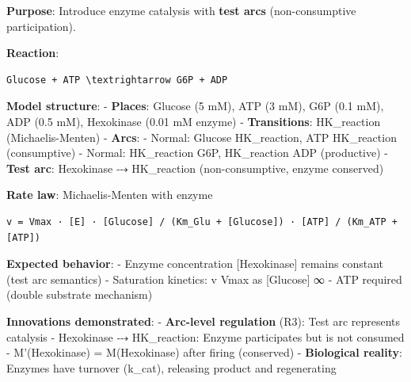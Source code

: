 \textbf{Purpose}: Introduce enzyme catalysis with \textbf{test arcs}
(non-consumptive participation).

\textbf{Reaction}:

\begin{lstlisting}
Glucose + ATP \textrightarrow G6P + ADP
\end{lstlisting}

\textbf{Model structure}: - \textbf{Places}: Glucose (5 mM), ATP (3 mM),
G6P (0.1 mM), ADP (0.5 mM), Hexokinase (0.01 mM enzyme) -
\textbf{Transitions}: HK\_reaction (Michaelis-Menten) - \textbf{Arcs}: -
Normal: Glucose \textrightarrow HK\_reaction, ATP \textrightarrow HK\_reaction (consumptive) -
Normal: HK\_reaction \textrightarrow G6P, HK\_reaction \textrightarrow ADP (productive) -
\textbf{Test arc}: Hexokinase ⤏ HK\_reaction (non-consumptive, enzyme
conserved)

\textbf{Rate law}: Michaelis-Menten with enzyme

\begin{lstlisting}
v = Vmax · [E] · [Glucose] / (Km_Glu + [Glucose]) · [ATP] / (Km_ATP + [ATP])
\end{lstlisting}

\textbf{Expected behavior}: - Enzyme concentration {[}Hexokinase{]}
remains constant (test arc semantics) - Saturation kinetics: v \textrightarrow Vmax as
{[}Glucose{]} \textrightarrow ∞ - ATP required (double substrate mechanism)

\textbf{Innovations demonstrated}: - \checkmark \textbf{Arc-level regulation}
(R3): Test arc represents catalysis - Hexokinase ⤏ HK\_reaction: Enzyme
participates but is not consumed - M'(Hexokinase) = M(Hexokinase) after
firing (conserved) - \textbf{Biological reality}: Enzymes have turnover
(k\_cat), releasing product and regenerating

